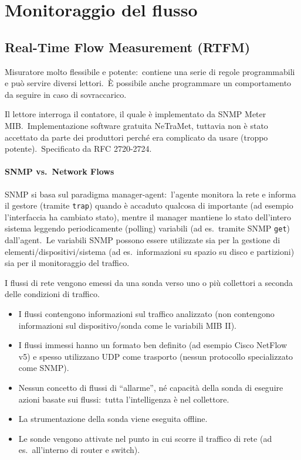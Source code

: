 \chapter{Monitoraggio del flusso}

\section{Real-Time Flow Measurement (RTFM)}

Misuratore molto flessibile e potente:\ contiene una serie di regole programmabili e può servire diversi lettori.\
È possibile anche programmare un comportamento da seguire in caso di sovraccarico.\

Il lettore interroga il contatore, il quale è implementato da SNMP Meter MIB.\
Implementazione software gratuita NeTraMet, tuttavia non è stato accettato da parte dei produttori perché era complicato da usare (troppo potente).\
Specificato da RFC 2720-2724.

\subsubsection{SNMP vs.\ Network Flows}

SNMP si basa sul paradigma manager-agent:\ l'agente monitora la rete e informa il gestore (tramite \texttt{trap}) quando è accaduto qualcosa di importante (ad esempio l'interfaccia ha cambiato stato), mentre il manager mantiene lo stato dell'intero sistema leggendo periodicamente (polling) variabili (ad es.\ tramite SNMP \texttt{get}) dall'agent.\
Le variabili SNMP possono essere utilizzate sia per la gestione di elementi{\slash}dispositivi{\slash}sistema (ad es.\ informazioni su spazio su disco e partizioni) sia per il monitoraggio del traffico.

I flussi di rete vengono emessi da una sonda verso uno o più collettori a seconda delle condizioni di traffico.\

\begin{itemize}
    \item I flussi contengono informazioni sul traffico analizzato (non contengono informazioni sul dispositivo/sonda come le variabili MIB II).\
    \item I flussi immessi hanno un formato ben definito (ad esempio Cisco NetFlow v5) e spesso utilizzano UDP come trasporto (nessun protocollo specializzato come SNMP).
    \item Nessun concetto di flussi di ``allarme'', né capacità della sonda di eseguire azioni basate sui flussi:\ tutta l'intelligenza è nel collettore.\
    \item La strumentazione della sonda viene eseguita offline.\
    \item Le sonde vengono attivate nel punto in cui scorre il traffico di rete (ad es.\ all'interno di router e switch).
\end{itemize}

